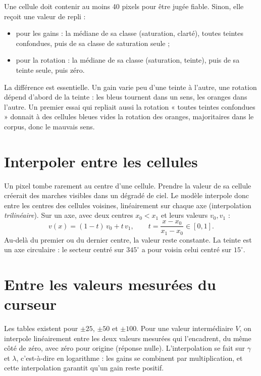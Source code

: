 Une cellule doit contenir au moins 40 pixels pour être jugée fiable. Sinon,
elle reçoit une valeur de repli :
\begin{itemize}
\item pour les gains : la médiane de sa classe (saturation, clarté), toutes
teintes confondues, puis de sa classe de saturation seule ;
\item pour la rotation : la médiane de sa classe (saturation, teinte), puis de
sa teinte seule, puis zéro.
\end{itemize}
La différence est essentielle. Un gain varie peu d'une teinte à l'autre, une
rotation dépend d'abord de la teinte : les bleus tournent dans un sens, les
oranges dans l'autre. Un premier essai qui repliait aussi la rotation « toutes
teintes confondues » donnait à des cellules bleues vides la rotation des
oranges, majoritaires dans le corpus, donc le mauvais sens.


\section{Interpoler entre les cellules}
Un pixel tombe rarement au centre d'une cellule. Prendre la valeur de sa
cellule créerait des marches visibles dans un dégradé de ciel. Le modèle
interpole donc entre les centres des cellules voisines, linéairement sur
chaque axe (interpolation \emph{trilinéaire}). Sur un axe, avec deux centres
$x_0<x_1$ et leurs valeurs $v_0,v_1$ :
\begin{equation}
v(x)=(1-t)\,v_0+t\,v_1,\qquad t=\frac{x-x_0}{x_1-x_0}\in[0,1].
\end{equation}
Au-delà du premier ou du dernier centre, la valeur reste constante. La teinte
est un axe circulaire : le secteur centré sur $345^\circ$ a pour voisin celui
centré sur $15^\circ$.

\section{Entre les valeurs mesurées du curseur}
Les tables existent pour $\pm25$, $\pm50$ et $\pm100$. Pour une valeur
intermédiaire $V$, on interpole linéairement entre les deux valeurs mesurées
qui l'encadrent, du même côté de zéro, avec zéro pour origine (réponse nulle).
L'interpolation se fait sur $\gamma$ et $\lambda$, c'est-à-dire en
logarithme : les gains se combinent par multiplication, et cette interpolation
garantit qu'un gain reste positif.

